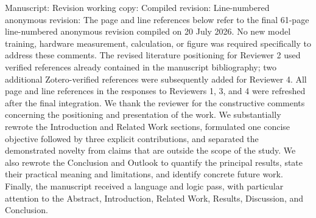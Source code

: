\markdownRendererDocumentBegin
\markdownRendererSectionBegin
{}\markdownRendererInterblockSeparator
{}Manuscript: \markdownRendererParagraphSeparator
{}Revision working copy: \markdownRendererParagraphSeparator
{}Compiled revision: \markdownRendererParagraphSeparator
{}Line-numbered anonymous revision: \markdownRendererParagraphSeparator
{}The page and line references below refer to the final 61-page line-numbered anonymous revision compiled on 20 July 2026. No new model training, hardware measurement, calculation, or figure was required specifically to address these comments. The revised literature positioning for Reviewer 2 used verified references already contained in the manuscript bibliography; two additional Zotero-verified references were subsequently added for Reviewer 4. All page and line references in the responses to Reviewers 1, 3, and 4 were refreshed after the final integration.\markdownRendererInterblockSeparator
{}\markdownRendererSectionBegin
{}\markdownRendererInterblockSeparator
{}We thank the reviewer for the constructive comments concerning the positioning and presentation of the work. We substantially rewrote the Introduction and Related Work sections, formulated one concise objective followed by three explicit contributions, and separated the demonstrated novelty from claims that are outside the scope of the study. We also rewrote the Conclusion and Outlook to quantify the principal results, state their practical meaning and limitations, and identify concrete future work. Finally, the manuscript received a language and logic pass, with particular attention to the Abstract, Introduction, Related Work, Results, Discussion, and Conclusion.\markdownRendererInterblockSeparator
{}
\markdownRendererSectionEnd \markdownRendererSectionBegin
{}\markdownRendererInterblockSeparator
